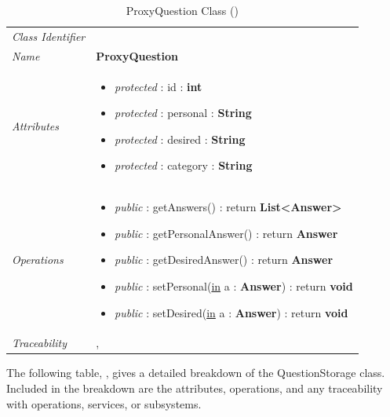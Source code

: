 \documentclass[12pt,letterpaper]{article}
\begin{document}
\begin{table}[H]
    \caption{ProxyQuestion Class ()} 
	\begin{tabu} to 
		\toprule
		Class Identifier &  \\
		Name & {\bf ProxyQuestion} \\
		Attributes & 
		\begin{minipage}[t]{\linewidth}
		    \begin{itemize}
		        \item \textit{protected} : id : {\bf int}
		        \item \textit{protected} : personal : {\bf String}
		        \item \textit{protected} : desired : {\bf String}
		        \item \textit{protected} : category : {\bf String}
			\end{itemize}
	    \end{minipage} \\

		Operations &
		\begin{minipage}[t]{\linewidth}
			\begin{itemize}
			    \item {\it public} : getAnswers() : return {\bf List<Answer>}
			    \item {\it public} : getPersonalAnswer() : return {\bf Answer}
			    \item {\it public} : getDesiredAnswer() : return {\bf Answer}
			    \item {\it public} : setPersonal(\underline{in} a : {\bf Answer}) : return {\bf void}
			    \item {\it public} : setDesired(\underline{in} a : {\bf Answer}) : return {\bf void}
	        \end{itemize}
	    \end{minipage} \\
	    	Traceability & , \\
		\toprule
	\end{tabu}
\end{table}

The following table, , gives a detailed breakdown of the QuestionStorage class. Included in the breakdown are the attributes, operations, and any traceability with operations, services, or subsystems.
\end{document}
